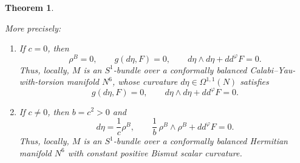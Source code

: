\documentclass{article}
\newtheorem{thm}{Theorem}[section]
\theoremstyle{definition}
\renewcommand{\phi}{\varphi}
\numberwithin{equation}{section}
\begin{document}
\begin{thm}
\begin{enumerate}
More precisely:

\begin{enumerate}
\item If $c=0$, then
\[
\rho^B=0,
\qquad
g(d\eta,F)=0,
\qquad
d\eta\wedge d\eta+dd^\phi F=0.
\]
Thus, locally, $M$ is an $S^1$-bundle over a conformally balanced
Calabi--Yau-with-torsion manifold $N^6$, whose curvature
$d\eta\in\Omega^{1,1}(N)$ satisfies
\[
g(d\eta,F)=0,
\qquad
d\eta\wedge d\eta+dd^\phi F=0.
\]

\item If $c\neq0$, then $b=c^2>0$ and
\[
d\eta=\frac1c\rho^B,
\qquad
\frac1b\,\rho^B\wedge\rho^B+dd^\phi F=0.
\]
Thus, locally, $M$ is an $S^1$-bundle over a conformally balanced
Hermitian manifold $N^6$ with constant positive Bismut scalar
curvature.
\end{enumerate}
\end{enumerate}
\end{thm}
\end{document}

